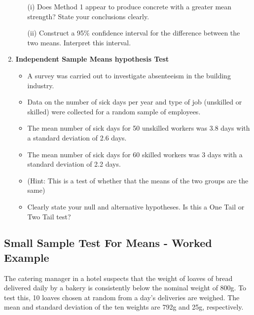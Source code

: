 \begin{enumerate}
\begin{itemize}
\item[(i)] Does Method 1 appear to produce concrete with a greater mean strength? State your conclusions clearly.
\item[(ii)] Construct a 95\% confidence interval for the difference between the two means. Interpret this interval.

\end{itemize}

\item \textbf{Independent Sample Means hypothesis Test }

\begin{itemize}
\item A survey was carried out to investigate absenteeism in the building industry.
\item Data on the number of sick days per year and type of job (unskilled or skilled)
were collected for a random sample of employees.
\item The mean number of sick days for 50 unskilled workers was 3.8 days with a standard deviation of 2.6 days. 
\item The mean number of sick days for 60 skilled workers was 3 days with a standard deviation of 2.2 days. 
\item (Hint: This is a test of whether that the means of the two groups are the same)

\item Clearly state your null and alternative hypotheses.
Is this a One Tail or Two Tail test?
\end{itemize}

\end{enumerate}








\subsection{Small Sample Test For Means - Worked Example}
The catering manager in a hotel suspects that the weight of loaves of bread delivered
daily by a bakery is consistently below the nominal weight of 800g. To test this,
10 loaves chosen at random from a day’s deliveries are weighed. The mean and
standard deviation of the ten weights are 792g and 25g, respectively.

